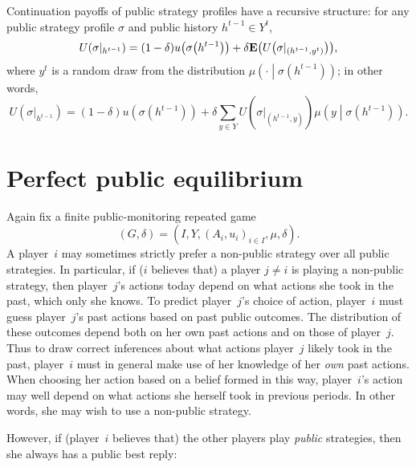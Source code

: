 Continuation payoffs of public strategy profiles have a recursive structure: for any public strategy profile $\sigma$ and public history $h^{t-1} \in Y^t$,
%
\begin{equation*}
	U\left(\sigma|_{h^{t-1}}\right)
	= (1-\delta) u\left( \sigma\left( h^{t-1} \right) \right)
	+ \delta \E\left( U\left( \sigma|_{\left( h^{t-1}, y^t \right)} \right) \right),
\end{equation*}
%
where $y^t$ is a random draw from the distribution $\mu\left( \cdot \middle| \sigma\left( h^{t-1} \right) \right)$; in other words,
%
\begin{equation*}
	U\left(\sigma|_{h^{t-1}}\right)
	= (1-\delta) u\left( \sigma\left( h^{t-1} \right) \right)
	+ \delta \sum_{y \in Y}
	U\left( \sigma|_{\left( h^{t-1}, y \right)} \right)
	\mu\left( y \middle| \sigma\left( h^{t-1} \right) \right) .
\end{equation*}



\section{Perfect public equilibrium}
\label{aps:ppe}

Again fix a finite public-monitoring repeated game
%
\begin{equation*}
	(G,\delta) = \left( I, Y, (A_i, u_i)_{i \in I}, \mu, \delta \right) .
\end{equation*}
%
A player~$i$ may sometimes strictly prefer a non-public strategy over all public strategies. In particular, if ($i$ believes that) a player $j \neq i$ is playing a non-public strategy, then player~$j$'s actions today depend on what actions she took in the past, which only she knows. To predict player~$j$'s choice of action, player~$i$ must guess player~$j$'s past actions based on past public outcomes. The distribution of these outcomes depend both on her own past actions and on those of player~$j$. Thus to draw correct inferences about what actions player~$j$ likely took in the past, player~$i$ must in general make use of her knowledge of her \emph{own} past actions. When choosing her action based on a belief formed in this way, player~$i$'s action may well depend on what actions she herself took in previous periods. In other words, she may wish to use a non-public strategy.

However, if (player~$i$ believes that) the other players play \emph{public} strategies, then she always has a public best reply:

